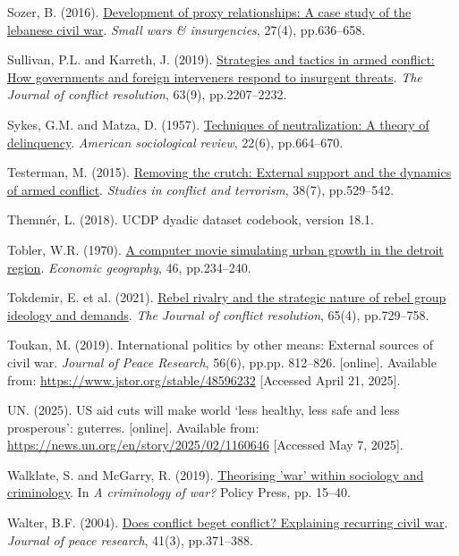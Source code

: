 \documentclass[
]{article}
\newlength{\cslhangindent}
\newenvironment{CSLReferences}[2] %
 {\begin{list}{}{%
  \setlength{\itemindent}{0pt}
  \setlength{\leftmargin}{0pt}
  \setlength{\parsep}{0pt}
  \ifodd #1
   \setlength{\leftmargin}{\cslhangindent}
   \setlength{\itemindent}{-1\cslhangindent}
  \fi
  \setlength{\itemsep}{#2\baselineskip}}}
 {\end{list}}
\begin{document}
\begin{CSLReferences}{0}{1}
Sozer, B. (2016).
\href{https://doi.org/10.1080/09592318.2016.1189495}{Development of
proxy relationships: A case study of the lebanese civil war}.
\emph{Small wars \& insurgencies}, 27(4), pp.636--658.

Sullivan, P.L. and Karreth, J. (2019).
\href{https://doi.org/10.1177/0022002719828103}{Strategies and tactics
in armed conflict: How governments and foreign interveners respond to
insurgent threats}. \emph{The Journal of conflict resolution}, 63(9),
pp.2207--2232.

Sykes, G.M. and Matza, D. (1957).
\href{https://doi.org/10.2307/2089195}{Techniques of neutralization: A
theory of delinquency}. \emph{American sociological review}, 22(6),
pp.664--670.

Testerman, M. (2015).
\href{https://doi.org/10.1080/1057610X.2015.1016312}{Removing the
crutch: External support and the dynamics of armed conflict}.
\emph{Studies in conflict and terrorism}, 38(7), pp.529--542.

Themnér, L. (2018). UCDP dyadic dataset codebook, version 18.1.

Tobler, W.R. (1970). \href{https://doi.org/10.2307/143141}{A computer
movie simulating urban growth in the detroit region}. \emph{Economic
geography}, 46, pp.234--240.

Tokdemir, E. et al. (2021).
\href{https://doi.org/10.1177/0022002720967411}{Rebel rivalry and the
strategic nature of rebel group ideology and demands}. \emph{The Journal
of conflict resolution}, 65(4), pp.729--758.

Toukan, M. (2019). International politics by other means: External
sources of civil war. \emph{Journal of Peace Research}, 56(6), pp.pp.
812--826. {[}online{]}. Available from:
\url{https://www.jstor.org/stable/48596232} {[}Accessed April 21,
2025{]}.

UN. (2025). US aid cuts will make world {`less healthy, less safe and
less prosperous'}: guterres. {[}online{]}. Available from:
\url{https://news.un.org/en/story/2025/02/1160646} {[}Accessed May 7,
2025{]}.

Walklate, S. and McGarry, R. (2019).
\href{https://doi.org/10.51952/9781529202618.ch002}{Theorising 'war'
within sociology and criminology}. In \emph{A criminology of war?}
Policy Press, pp. 15--40.

Walter, B.F. (2004).
\href{https://doi.org/10.1177/0022343304043775}{Does conflict beget
conflict? Explaining recurring civil war}. \emph{Journal of peace
research}, 41(3), pp.371--388.

\end{CSLReferences}
\end{document}
